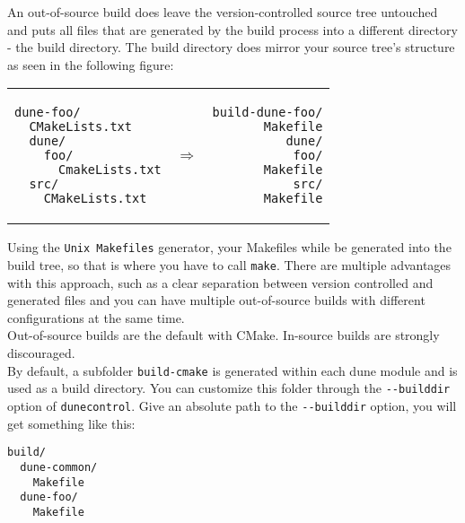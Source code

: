 \documentclass[a4paper,10pt]{scrartcl}
\begin{document}
An out-of-source build does leave the version-controlled source tree untouched and puts all files that are generated by the build process into a different directory - the build directory. The build directory does mirror your source tree's structure as seen in the following figure: \\
\begin{center}
\begin{tabular}{lcr}
\begin{minipage}{.4\textwidth}
\begin{verbatim}
dune-foo/
  CMakeLists.txt
  dune/
    foo/
      CmakeLists.txt
  src/
    CMakeLists.txt
\end{verbatim}
\end{minipage} &
$\Rightarrow$ &
\begin{minipage}{.4\textwidth}
\begin{verbatim}
build-dune-foo/
  Makefile
  dune/
    foo/
      Makefile
  src/
    Makefile
\end{verbatim}
\end{minipage}
\end{tabular}
\end{center}
Using the \lstinline!Unix Makefiles! generator, your Makefiles while be generated into the build tree, so that is where you have to call \lstinline!make!. There are multiple advantages with this approach, such as a clear separation between version controlled and generated files and you can have multiple out-of-source builds with different configurations at the same time. \\

Out-of-source builds are the default with CMake. In-source builds are strongly discouraged. \\

By default, a subfolder \verb!build-cmake! is generated within each dune module and is used as a build directory. You can customize this folder through the \verb!--builddir! option of \verb!dunecontrol!. Give an absolute path to the \verb!--builddir! option, you will get something like this:

\begin{center}
 \begin{verbatim}
build/
  dune-common/
    Makefile
  dune-foo/
    Makefile
\end{verbatim}
\end{center}
\end{document}
